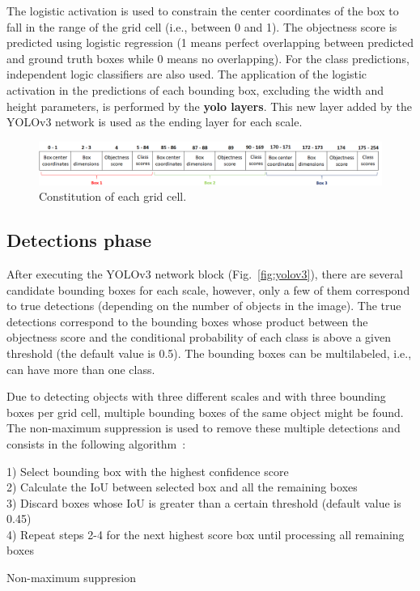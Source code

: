 The logistic activation is used to constrain the center coordinates of the box to fall in the range of the grid cell (i.e., between 0 and 1). The objectness score is predicted using logistic regression (1 means perfect overlapping between predicted and ground truth boxes while 0 means no overlapping). For the class predictions, independent logic classifiers are also used. The application of the logistic activation in the predictions of each bounding box, excluding the width and height parameters, is performed by the \textbf{yolo layers}. This new layer added by the YOLOv3 network is used as the ending layer for each scale.

\begin{figure}[!htb]
  \centering
  \includegraphics[width=\textwidth]{Figures/grid_cell.png}
  \caption{Constitution of each grid cell.}
  \label{fig:grid_cell}
\end{figure}
\vspace{-0.3cm}

\subsection{Detections phase}

After executing the YOLOv3 network block (Fig.~\ref{fig:yolov3}), there are several candidate bounding boxes for each scale, however, only a few of them correspond to true detections (depending on the number of objects in the image). The true detections correspond to the bounding boxes whose product between the objectness score and the conditional probability of each class is above a given threshold (the default value is 0.5). The bounding boxes can be multilabeled, i.e., can have more than one class. 

Due to detecting objects with three different scales and with three bounding boxes per grid cell, multiple bounding boxes of the same object might be found. The non-maximum suppression is used to remove these multiple detections and consists in the following algorithm~\cite{Redmon2015YouOL}:
\vspace{0.3cm}

\begin{algorithm}[H]
 1) Select bounding box with the highest confidence score \\
 2) Calculate the IoU between selected box and all the remaining boxes \\
 3) Discard boxes whose IoU is greater than a certain threshold (default value is 0.45)\\
 4) Repeat steps 2-4 for the next highest score box until processing all remaining boxes
 \caption{Non-maximum suppresion}
\end{algorithm}

